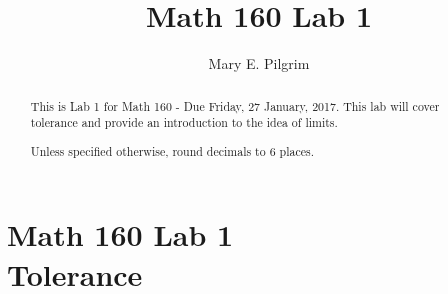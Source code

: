 \documentclass[handout,nooutcomes]{ximera}
\title{Math 160 Lab 1}
\author{Mary E. Pilgrim}
\begin{document}
\section{Math 160 Lab 1 \\ Tolerance}

\begin{abstract}
This is Lab 1 for Math 160 - Due Friday, 27 January, 2017. This lab will cover tolerance and provide an introduction to the idea of limits.

Unless specified otherwise, round decimals to 6 places.
\end{abstract}

\maketitle
\end{document}
